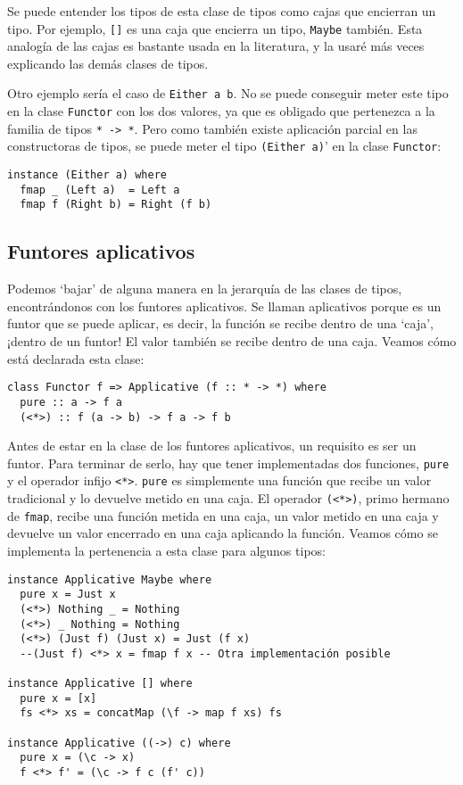 \documentclass[class=article, crop=false]{standalone}
\begin{document}
Se puede entender los tipos de esta clase de tipos como cajas que encierran un tipo. Por
ejemplo, \verb`[]` es una caja que encierra un tipo, \verb`Maybe` también. Esta analogía de
las cajas es bastante usada en la literatura, y la usaré más veces explicando las demás
clases de tipos.

Otro ejemplo sería el caso de \verb`Either a b`. No se puede conseguir meter este tipo en la
clase \verb`Functor` con los dos valores, ya que es obligado que pertenezca a la familia de
tipos \verb`* -> *`. Pero como también existe aplicación parcial en las constructoras de
tipos, se puede meter el tipo \verb`(Either a)`' en la clase \verb`Functor`:

\begin{verbatim}
instance (Either a) where
  fmap _ (Left a)  = Left a
  fmap f (Right b) = Right (f b)
\end{verbatim}

\subsection{Funtores aplicativos}
Podemos `bajar' de alguna manera en la jerarquía de las clases de tipos, encontrándonos con
los funtores aplicativos. Se llaman aplicativos porque es un funtor que se puede aplicar,
es decir, la función se recibe dentro de una `caja', ¡dentro de un funtor! El valor también
se recibe dentro de una caja. Veamos cómo está declarada esta clase:

\begin{verbatim}
class Functor f => Applicative (f :: * -> *) where
  pure :: a -> f a
  (<*>) :: f (a -> b) -> f a -> f b
\end{verbatim}

Antes de estar en la clase de los funtores aplicativos, un requisito es ser un funtor. Para
terminar de serlo, hay que tener implementadas dos funciones, \verb`pure` y el operador
infijo \verb`<*>`. \verb`pure` es simplemente una función que recibe un valor tradicional y
lo devuelve metido en una caja. El operador \verb`(<*>)`, primo hermano de \verb`fmap`,
recibe una función metida en una caja, un valor metido en una caja y devuelve un valor
encerrado en una caja aplicando la función. Veamos cómo se implementa la pertenencia a esta
clase para algunos tipos:

\begin{verbatim}
instance Applicative Maybe where
  pure x = Just x
  (<*>) Nothing _ = Nothing
  (<*>) _ Nothing = Nothing
  (<*>) (Just f) (Just x) = Just (f x)
  --(Just f) <*> x = fmap f x -- Otra implementación posible

instance Applicative [] where
  pure x = [x]
  fs <*> xs = concatMap (\f -> map f xs) fs

instance Applicative ((->) c) where
  pure x = (\c -> x)
  f <*> f' = (\c -> f c (f' c))
\end{verbatim}
\end{document}
